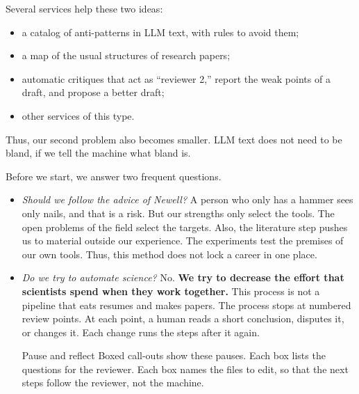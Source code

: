 Several services help these two ideas:
\begin{itemize}
\item a catalog of anti-patterns in LLM text, with rules to avoid
them; \item a map of the usual structures of research papers; \item
automatic critiques that act as ``reviewer 2,'' report the weak points
of a draft, and propose a better draft; \item other services of this
type.
\end{itemize}
Thus, our second problem also becomes smaller.
LLM text does not need to be bland, if we tell the machine what bland
is.

Before we start, we answer two frequent questions.
\begin{itemize}
\item {\em Should we follow the advice of Newell?}
A person who only has a hammer sees only nails, and that is a risk.
But our strengths only select the tools.
The open problems of the field select the targets.
Also, the literature step pushes us to material outside our
experience.
The experiments test the premises of our own tools.
Thus, this method does not lock a career in one place.
\item {\em Do we try to automate science?}
No. \textbf{We try to decrease the effort that scientists spend when
they work together.}
This process is not a pipeline that eats resumes and makes papers.
The process stops at numbered review points.
At each point, a human reads a short conclusion, disputes it, or
changes it.
Each change runs the steps after it again.
\begin{pause}{Pause and reflect}
Boxed call-outs show these pauses.
Each box lists the questions for the reviewer.
Each box names the files to edit, so that the next steps follow the
reviewer, not the machine.
\end{pause}
\end{itemize}
